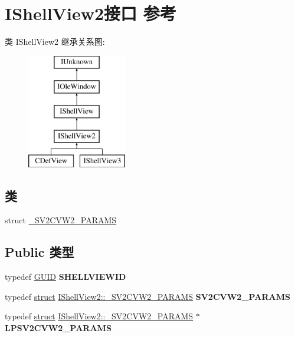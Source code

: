 \hypertarget{interface_i_shell_view2}{}\section{I\+Shell\+View2接口 参考}
\label{interface_i_shell_view2}
类 I\+Shell\+View2 继承关系图\+:\begin{figure}[H]
\begin{center}
\leavevmode
\includegraphics[height=5.000000cm]{interface_i_shell_view2}
\end{center}
\end{figure}
\subsection*{类}
\begin{DoxyCompactItemize}
\item 
struct \hyperlink{struct_i_shell_view2_1_1___s_v2_c_v_w2___p_a_r_a_m_s}{\+\_\+\+S\+V2\+C\+V\+W2\+\_\+\+P\+A\+R\+A\+MS}
\end{DoxyCompactItemize}
\subsection*{Public 类型}
\begin{DoxyCompactItemize}
\item 
\mbox{\label{interface_i_shell_view2_a909d0de47a93fc88470de979f0d71b3c}} 
typedef \hyperlink{interface_g_u_i_d}{G\+U\+ID} {\bfseries S\+H\+E\+L\+L\+V\+I\+E\+W\+ID}
\item 
\mbox{\label{interface_i_shell_view2_ac89df87569b08ce5c16dcf7ebb301322}} 
typedef \hyperlink{interfacestruct}{struct} \hyperlink{struct_i_shell_view2_1_1___s_v2_c_v_w2___p_a_r_a_m_s}{I\+Shell\+View2\+::\+\_\+\+S\+V2\+C\+V\+W2\+\_\+\+P\+A\+R\+A\+MS} {\bfseries S\+V2\+C\+V\+W2\+\_\+\+P\+A\+R\+A\+MS}
\item 
\mbox{\label{interface_i_shell_view2_a59c676969cd3b48bdd70adf532b3bff4}} 
typedef \hyperlink{interfacestruct}{struct} \hyperlink{struct_i_shell_view2_1_1___s_v2_c_v_w2___p_a_r_a_m_s}{I\+Shell\+View2\+::\+\_\+\+S\+V2\+C\+V\+W2\+\_\+\+P\+A\+R\+A\+MS} $\ast$ {\bfseries L\+P\+S\+V2\+C\+V\+W2\+\_\+\+P\+A\+R\+A\+MS}
\end{DoxyCompactItemize}
